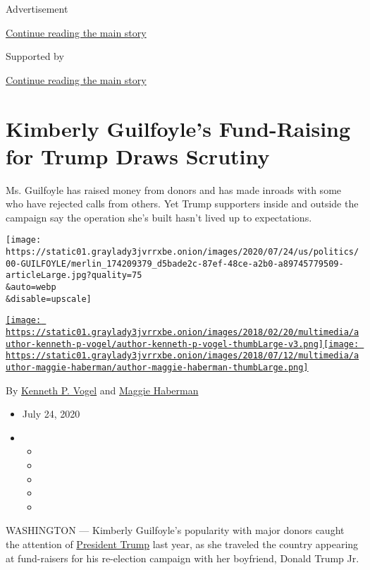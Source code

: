 Advertisement

\protect\hyperlink{after-top}{Continue reading the main story}

Supported by

\protect\hyperlink{after-sponsor}{Continue reading the main story}

\hypertarget{kimberly-guilfoyles-fund-raising-for-trump-draws-scrutiny}{%
\section{Kimberly Guilfoyle's Fund-Raising for Trump Draws
Scrutiny}\label{kimberly-guilfoyles-fund-raising-for-trump-draws-scrutiny}}

Ms. Guilfoyle has raised money from donors and has made inroads with
some who have rejected calls from others. Yet Trump supporters inside
and outside the campaign say the operation she's built hasn't lived up
to expectations.

\texttt{[image: https://static01.graylady3jvrrxbe.onion/images/2020/07/24/us/politics/00-GUILFOYLE/merlin\_174209379\_d5bade2c-87ef-48ce-a2b0-a89745779509-articleLarge.jpg?quality=75\\\&auto=webp\\\&disable=upscale]}

\href{https://www.nytimes3xbfgragh.onion/by/kenneth-p-vogel}{\texttt{[image: https://static01.graylady3jvrrxbe.onion/images/2018/02/20/multimedia/author-kenneth-p-vogel/author-kenneth-p-vogel-thumbLarge-v3.png]}}\href{https://www.nytimes3xbfgragh.onion/by/maggie-haberman}{\texttt{[image: https://static01.graylady3jvrrxbe.onion/images/2018/07/12/multimedia/author-maggie-haberman/author-maggie-haberman-thumbLarge.png]}}

By \href{https://www.nytimes3xbfgragh.onion/by/kenneth-p-vogel}{Kenneth
P. Vogel} and
\href{https://www.nytimes3xbfgragh.onion/by/maggie-haberman}{Maggie
Haberman}

\begin{itemize}
\item
  July 24, 2020
\item
  \begin{itemize}
  \item
  \item
  \item
  \item
  \item
  \end{itemize}
\end{itemize}

WASHINGTON --- Kimberly Guilfoyle's popularity with major donors caught
the attention of
\href{https://www.nytimes3xbfgragh.onion/interactive/2020/us/elections/donald-trump.html}{President
Trump} last year, as she traveled the country appearing at fund-raisers
for his re-election campaign with her boyfriend, Donald Trump Jr.


